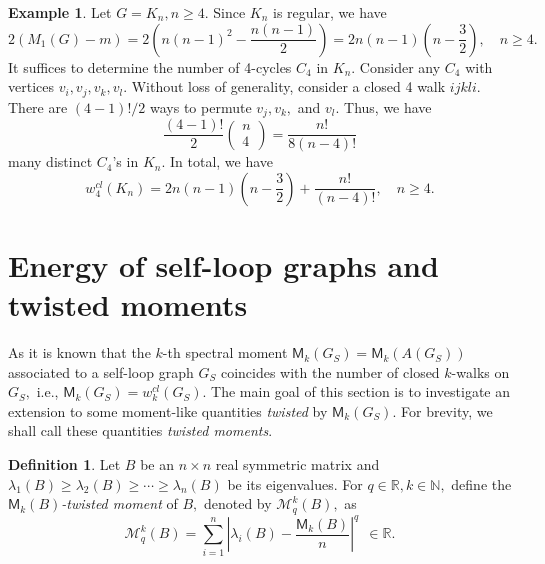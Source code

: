 \documentclass[12pt,a4paper,reqno]{amsart}
\numberwithin{equation}{section}
\theoremstyle{plain}
\theoremstyle{definition}
\newtheorem{definition}[theorem]{Definition}
\newtheorem{example}[theorem]{Example}
\newcommand{\<}{\langle}
\renewcommand{\>}{\rangle}
\newcommand{\cM}{{\mathcal M}}
\newcommand{\N}{{\mathbb N}}
\newcommand{\R}{{\mathbb R}}
\begin{document}
\begin{example}
Let $G=K_n, n\geq 4.$ Since $K_n$ is regular, we have%
\[
2(M_1(G)-m)=2\left(n(n-1)^2 - \frac{n(n-1)}{2}\right) = 2n(n-1)\left(n-\frac{3}{2}\right),\quad n\geq 4.
\]
It suffices to determine the number of 4-cycles $C_4$ in $K_n.$ Consider any $C_4$ with vertices $v_i,v_j,v_k,v_l.$ Without loss of generality, consider a closed 4 walk $ijkli.$ There are $(4-1)!/2$ ways to permute $v_j,v_k,$ and $v_l.$ 
Thus, we have 
\[
\frac{(4-1)!}{2}\begin{pmatrix}
    n \\ 4
\end{pmatrix} = \frac{n!}{8(n-4)!} 
\] many distinct $C_4$'s in $K_n.$ In total, we have
\[
w_4^{cl}(K_n) = 2n(n-1)\left(n-\frac{3}{2}\right)+\frac{n!}{(n-4)!}, \quad n \geq 4.
\] %
\end{example}



\section{Energy of self-loop graphs and twisted moments}
\label{sect3}

As it is known that the $k$-th spectral moment $\mathsf{M}_k(G_S)=\mathsf{M}_k(A(G_S))$ associated to a self-loop graph $G_S$ coincides with the number of closed $k$-walks on $G_S,$ i.e., $\mathsf{M}_k(G_S)=w^{cl}_k(G_S).$ The main goal of this section is to investigate an extension to some moment-like quantities \textit{twisted} by $\mathsf{M}_k(G_S)$. For brevity, we shall call these quantities \textit{twisted moments}. %

\begin{definition}\label{def3.1}
Let $B$ be an $n \times n$ real symmetric matrix and $\lambda_1(B) \geq \lambda_2(B) \geq \cdots \geq \lambda_n(B)$ be its eigenvalues. For $q \in \R, k \in \N,$ define the \textit{$\mathsf{M}_k(B)$-twisted moment} of $B,$ denoted by $\cM^k_q(B),$ as %
\[
\cM^k_q(B) = \sum^n_{i=1} \left|\lambda_i(B) - \frac{\mathsf{M}_k(B)}{n} \right|^q \:\: \in \R.  
\]
\end{definition}
\end{document}
